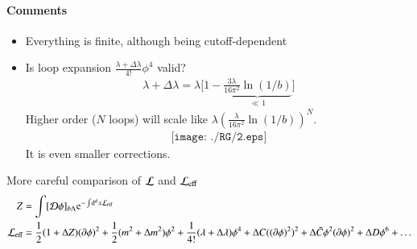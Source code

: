 \paragraph{Comments}
\begin{itemize}
   \item Everything is finite, although being cutoff-dependent
   \item Is loop expansion $\frac{\lambda + \Delta \lambda}{4!} \phi^4$ valid?
      \begin{align*}
         \lambda + \Delta \lambda = \lambda \bigg[ 1- \underbrace{\frac{3\lambda}{16 \pi^2} \ln(1/b)}_{\ll 1} \bigg]
      \end{align*}
      Higher order ($N$ loops) will scale like $\lambda (\frac{\lambda}{16\pi^2} \ln(1/b))^N$. 
      \begin{align*}
         \texttt{[image: ./RG/2.eps]} 
      \end{align*}
      It is even smaller corrections.
\end{itemize}

More careful comparison of $\mathcal{L} $ and $ \mathcal{L}_\text{eff}$
\begin{align*}
   Z &= \int [\mathcal{D} \phi]_{b \Lambda} \mathrm{e}^{- \int \dd[d]{x} \mathcal{L}_{\text{eff}}} \\
   \mathcal{L}_\text{eff} &= \frac{1}{2} (1 + \Delta Z) (\partial \phi)^2 + \frac{1}{2} (m^2 + \Delta m^2) \phi^2 + \frac{1}{4!} (\lambda + \Delta \lambda) \phi^4 + \Delta C ((\partial \phi)^2)^2 + \Delta \tilde{C} \phi^2 (\partial \phi)^2 + \Delta D \phi^6 + \dots
\end{align*}

